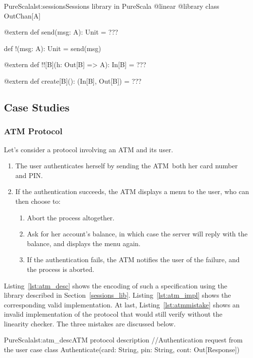 \documentclass[a4paper,twoside]{article}
\newcommand{\RefSec}[1]{Section~\ref{#1}}
\newcommand{\RefCode}[1]{Listing~\ref{#1}}
\begin{document}
\begin{enumerate}
\begin{Code}{PureScala}{lst:sessions}{Sessions library in PureScala}
@linear @library
class OutChan[A] {

  @extern
  def send(msg: A): Unit = {
    ???
  }

  def !(msg: A): Unit = {
    send(msg)
  }

  @extern
  def !![B](h: Out[B] => A): In[B] = {
    ???
  }

  @extern
  def create[B](): (In[B], Out[B]) = {
    ???
  }
}
\end{Code}

\subsection{Case Studies}

\subsubsection{ATM Protocol}

Let's consider a protocol involving an ATM and its user.

\begin{enumerate}
\item The user authenticates herself by sending the ATM both her card number and PIN.
\item If the authentication succeeds, the ATM displays a menu to the user, who can then choose to:
\begin{enumerate}
\item Abort the process altogether.
\item Ask for her account's balance, in which case the server will reply with the balance, and displays the menu again.
\item If the authentication fails, the ATM notifies the user of the failure, and the process is aborted.
\end{enumerate}
\end{enumerate}

\RefCode{lst:atm_desc} shows the encoding of such a specification using the library described in \RefSec{sessions_lib}. \RefCode{lst:atm_impl} shows the corresponding valid implementation. At last, \RefCode{lst:atmmistake} shows an invalid implementation of the protocol that would still verify without the linearity checker. The three mistakes are discussed below.

\begin{Code}{PureScala}{lst:atm_desc}{ATM protocol description}
//Authentication request from the user
case class Authenticate(card: String, pin: String, cont: Out[Response])


\end{Code}
\end{enumerate}
\end{document}
